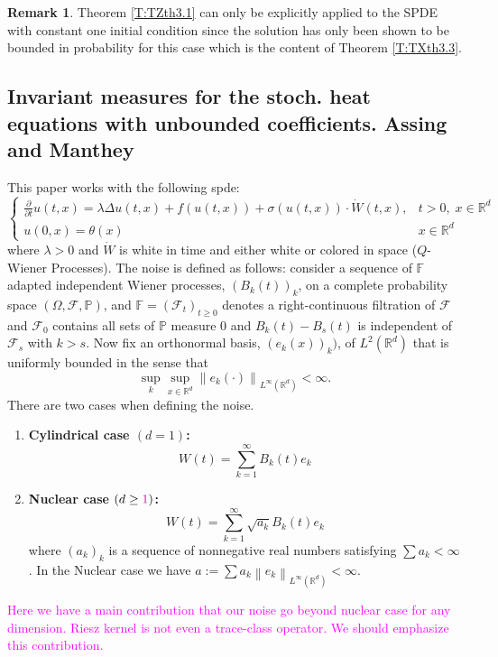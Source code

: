 \documentclass[a4paper,11pt]{article}%
\numberwithin{equation}{section}
\theoremstyle{plain}
\theoremstyle{definition}
\newtheorem{remark}[theorem]{Remark}
\newcommand{\R}{\mathbb{R}}
\newcommand{\Norm}[1]{\left\|  #1   \right\|}
\begin{document}
\begin{remark}
	Theorem \ref{T:TZth3.1} can only be explicitly applied to the SPDE with constant one initial condition since the solution has only been shown to be bounded in probability for this case which is the content of Theorem \ref{T:TXth3.3}.
\end{remark}

\subsection{Invariant measures for the stoch. heat equations with unbounded coefficients. Assing and Manthey \cite{AM03}}

This paper works with the following spde:
	\[
	\begin{cases}
		\frac{\partial}{\partial t} u(t,x) = \lambda \Delta u(t,x) + f(u(t,x)) + \sigma(u(t,x)) \cdot \dot{W}(t,x), & t>0, \; x \in \R^d
	\\ u(0,x) = \theta(x) & x \in \R^d
	\end{cases}
	\]
where $\lambda >0$ and $\dot{W}$ is white in time and either white or colored in space ($Q$-Wiener Processes). The noise is defined as follows: consider a sequence of $\mathbb{F}$ adapted independent Wiener processes, $(B_k(t))_k$, on a complete probability space $(\Omega, \mathscr{F}, \mathbb{P})$, and $\mathbb{F} = (\mathscr{F}_t)_{t\ge 0}$ denotes a right-continuous filtration of $\mathscr{F}$ and $\mathscr{F}_0$ contains all sets of $\mathbb{P}$ measure 0 and $B_k(t)-B_s(t)$ is independent of $\mathscr{F}_s$ with $k>s$. Now fix an orthonormal basis, $(e_k(x))_k)$, of $L^2(\R^d)$ that is uniformly bounded in the sense that
	\[
		\sup_{k} \sup_{x\in \R^d} \Norm{ e_k(\cdot) }_{L^\infty(\R^d)} < \infty.
	\]
There are two cases when defining the noise.

\begin{enumerate}
	\item \textbf{Cylindrical case $(d=1)$:}
		\[
			W(t) = \sum_{k=1}^{\infty} B_k(t)e_k
		\]
	\item \textbf{Nuclear case $(d \ge \textcolor{magenta}{1})$:}
		\[
			W(t) = \sum_{k=1}^{\infty} \sqrt{a_k} B_k(t) e_k
		\]
	where $(a_k)_k$ is a sequence of nonnegative real numbers satisfying $\sum a_k < \infty$. In the Nuclear case we have $a := \sum a_k \Norm{e_k}_{L^\infty(\R^d)} < \infty$.
\end{enumerate}

\bigskip
\textcolor{magenta}{Here we have a main contribution that our noise go beyond nuclear case for any dimension. Riesz
kernel is not even a trace-class operator. We should emphasize this contribution.}
\bigskip
\end{document}
